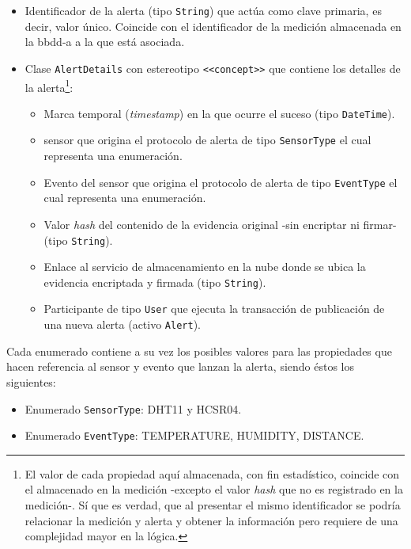 \documentclass[12pt,a4paper, twoside]{report}
\begin{document}
		\begin{itemize}
			\item Identificador de la alerta (tipo \texttt{String}) que actúa como clave primaria, es decir, valor único. Coincide con el identificador de la medición almacenada en la \gls{bbdd-a} a la que está asociada.
			\item Clase \texttt{AlertDetails} con estereotipo \texttt{<<concept>>} que contiene los detalles de la alerta\footnote{El valor de cada propiedad aquí almacenada, con fin estadístico, coincide con el almacenado en la medición -excepto el valor \textit{hash} que no es registrado en la medición-. Sí que es verdad, que al presentar el mismo identificador se podría relacionar la medición y alerta y obtener la información pero requiere de una complejidad mayor en la lógica.}:
			
			\begin{itemize}
				\item Marca temporal (\textit{timestamp}) en la que ocurre el suceso (tipo \texttt{DateTime}).
				\item \Gls{sensor} que origina el protocolo de alerta de tipo \texttt{SensorType} el cual representa una enumeración.
				\item Evento del \gls{sensor} que origina el protocolo de alerta de tipo \texttt{EventType} el cual representa una enumeración.
				\item Valor \textit{hash} del contenido de la evidencia original -sin encriptar ni firmar- (tipo \texttt{String}).
				\item Enlace al servicio de almacenamiento en la nube donde se ubica la evidencia encriptada y firmada (tipo \texttt{String}).
				\item Participante de tipo \texttt{User} que ejecuta la transacción de publicación de una nueva alerta (activo \texttt{Alert}).
			\end{itemize}
		\end{itemize}
		
		Cada enumerado contiene a su vez los posibles valores para las propiedades que hacen referencia al \gls{sensor} y evento que lanzan la alerta, siendo éstos los siguientes:
		
		\begin{itemize}
			\item Enumerado \texttt{SensorType}: DHT11 y HCSR04.
			\item Enumerado \texttt{EventType}: TEMPERATURE, HUMIDITY, DISTANCE.
		\end{itemize}
	
\end{document}
